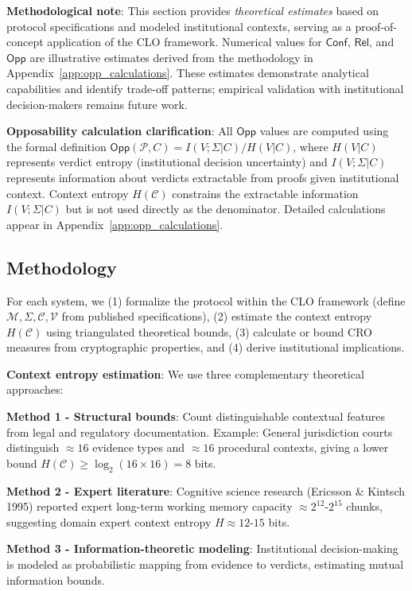 \documentclass{ieeeaccess}
\begin{document}
\textbf{Methodological note}: This section provides \emph{theoretical estimates} based on protocol specifications and modeled institutional contexts, serving as a proof-of-concept application of the CLO framework. Numerical values for $\mathsf{Conf}$, $\mathsf{Rel}$, and $\mathsf{Opp}$ are illustrative estimates derived from the methodology in Appendix~\ref{app:opp_calculations}. These estimates demonstrate analytical capabilities and identify trade-off patterns; empirical validation with institutional decision-makers remains future work.

\textbf{Opposability calculation clarification}: All $\mathsf{Opp}$ values are computed using the formal definition $\mathsf{Opp}(\mathcal{P}, C) = I(V;\Sigma|C)/H(V|C)$, where $H(V|C)$ represents verdict entropy (institutional decision uncertainty) and $I(V;\Sigma|C)$ represents information about verdicts extractable from proofs given institutional context. Context entropy $H(\mathcal{C})$ constrains the extractable information $I(V;\Sigma|C)$ but is not used directly as the denominator. Detailed calculations appear in Appendix~\ref{app:opp_calculations}.

\subsection{Methodology}

For each system, we (1) formalize the protocol within the CLO framework (define $\mathcal{M}, \Sigma, \mathcal{C}, \mathcal{V}$ from published specifications), (2) estimate the context entropy $H(\mathcal{C})$ using triangulated theoretical bounds, (3) calculate or bound CRO measures from cryptographic properties, and (4) derive institutional implications.

\textbf{Context entropy estimation}: We use three complementary theoretical approaches:

\textbf{Method 1 - Structural bounds}: Count distinguishable contextual features from legal and regulatory documentation. Example: General jurisdiction courts distinguish $\approx 16$ evidence types and $\approx 16$ procedural contexts, giving a lower bound $H(\mathcal{C}) \geq \log_2(16 \times 16) = 8$ bits.

\textbf{Method 2 - Expert literature}: Cognitive science research (Ericsson \& Kintsch 1995)\cite{Ericsson95} reported expert long-term working memory capacity $\approx 2^{12}$-$2^{15}$ chunks, suggesting domain expert context entropy $H \approx 12$-$15$ bits.

\textbf{Method 3 - Information-theoretic modeling}: Institutional decision-making is modeled as probabilistic mapping from evidence to verdicts, estimating mutual information bounds.
\end{document}
